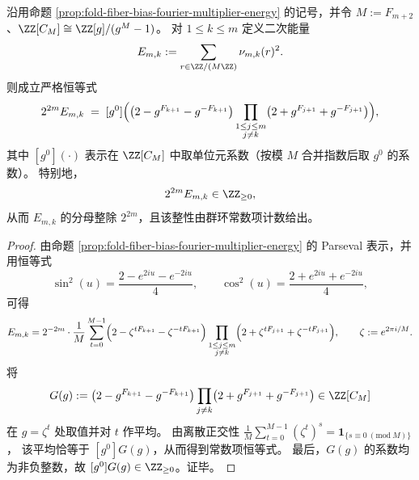 \begin{corollary}[条件偏置能量的群环常数项表示与二进制整性]\label{cor:fold-fiber-bias-energy-groupring-constant-term}
沿用命题 \ref{prop:fold-fiber-bias-fourier-multiplier-energy} 的记号，并令 \(M:=F_{m+2}\)、\(\ZZ[C_M]\cong\ZZ[g]/(g^M-1)\)。
对 \(1\le k\le m\) 定义二次能量
\[
E_{m,k}:=\sum_{r\in\ZZ/(M\ZZ)}\nu_{m,k}(r)^2.
\]
则成立严格恒等式
\[
2^{2m}E_{m,k}
\;=\;
[g^0]\Bigl(
\bigl(2-g^{F_{k+1}}-g^{-F_{k+1}}\bigr)
\prod_{\substack{1\le j\le m\\ j\ne k}}
\bigl(2+g^{F_{j+1}}+g^{-F_{j+1}}\bigr)
\Bigr),
\]
其中 \([g^0](\cdot)\) 表示在 \(\ZZ[C_M]\) 中取单位元系数（按模 \(M\) 合并指数后取 \(g^0\) 的系数）。
特别地，
\[
2^{2m}E_{m,k}\in\ZZ_{\ge 0},
\]
从而 \(E_{m,k}\) 的分母整除 \(2^{2m}\)，且该整性由群环常数项计数给出。
\end{corollary}
\begin{proof}
由命题 \ref{prop:fold-fiber-bias-fourier-multiplier-energy} 的 Parseval 表示，并用恒等式
\[
\sin^2(u)=\frac{2-e^{2iu}-e^{-2iu}}{4},
\qquad
\cos^2(u)=\frac{2+e^{2iu}+e^{-2iu}}{4},
\]
可得
\[
E_{m,k}
=2^{-2m}\cdot\frac{1}{M}\sum_{t=0}^{M-1}
\Bigl(2-\zeta^{tF_{k+1}}-\zeta^{-tF_{k+1}}\Bigr)
\prod_{\substack{1\le j\le m\\ j\ne k}}
\Bigl(2+\zeta^{tF_{j+1}}+\zeta^{-tF_{j+1}}\Bigr),
\qquad
\zeta:=e^{2\pi i/M}.
\]
将
\[
G(g):=
\bigl(2-g^{F_{k+1}}-g^{-F_{k+1}}\bigr)
\prod_{j\ne k}\bigl(2+g^{F_{j+1}}+g^{-F_{j+1}}\bigr)\in\ZZ[C_M]
\]
在 \(g=\zeta^t\) 处取值并对 \(t\) 作平均。
由离散正交性
\(
\frac{1}{M}\sum_{t=0}^{M-1}(\zeta^t)^s=\mathbf 1_{\{s\equiv 0\ (\mathrm{mod}\ M)\}}
\)，
该平均恰等于 \([g^0]G(g)\)，从而得到常数项恒等式。
最后，\(G(g)\) 的系数均为非负整数，故 \([g^0]G(g)\in\ZZ_{\ge 0}\)。证毕。
\end{proof}



\endinput

